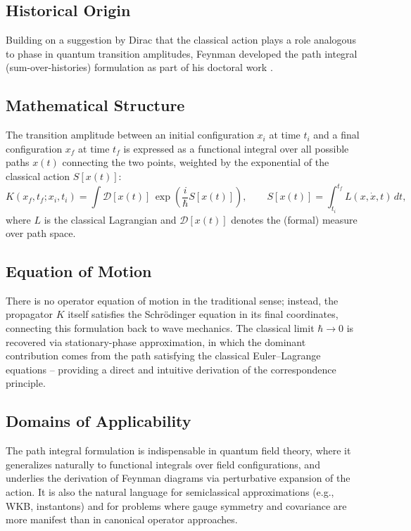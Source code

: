 \documentclass[11pt,a4paper]{article}
\begin{document}
\subsection{Historical Origin}

Building on a suggestion by Dirac that the classical action plays a role analogous to phase in quantum transition amplitudes, Feynman developed the path integral (sum-over-histories) formulation as part of his doctoral work \citep{feynman1948}.

\subsection{Mathematical Structure}

The transition amplitude between an initial configuration $x_i$ at time $t_i$ and a final configuration $x_f$ at time $t_f$ is expressed as a functional integral over all possible paths $x(t)$ connecting the two points, weighted by the exponential of the classical action $S[x(t)]$:
\begin{equation}
    K(x_f, t_f; x_i, t_i) = \int \mathcal{D}[x(t)]\, \exp\left(\frac{i}{\hbar} S[x(t)]\right), \qquad
    S[x(t)] = \int_{t_i}^{t_f} L(x, \dot{x}, t)\, dt,
\end{equation}
where $L$ is the classical Lagrangian and $\mathcal{D}[x(t)]$ denotes the (formal) measure over path space.

\subsection{Equation of Motion}

There is no operator equation of motion in the traditional sense; instead, the propagator $K$ itself satisfies the Schr\"odinger equation in its final coordinates, connecting this formulation back to wave mechanics. The classical limit $\hbar \to 0$ is recovered via stationary-phase approximation, in which the dominant contribution comes from the path satisfying the classical Euler--Lagrange equations -- providing a direct and intuitive derivation of the correspondence principle.

\subsection{Domains of Applicability}

The path integral formulation is indispensable in quantum field theory, where it generalizes naturally to functional integrals over field configurations, and underlies the derivation of Feynman diagrams via perturbative expansion of the action. It is also the natural language for semiclassical approximations (e.g., WKB, instantons) and for problems where gauge symmetry and covariance are more manifest than in canonical operator approaches.
\end{document}
